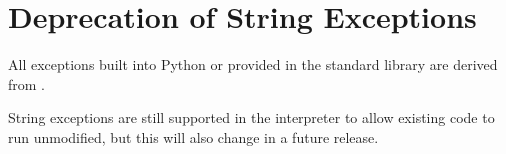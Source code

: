 \section{Deprecation of String Exceptions}

All exceptions built into Python or provided in the standard library
are derived from .

String exceptions are still supported in the interpreter to allow
existing code to run unmodified, but this will also change in a future 
release.

